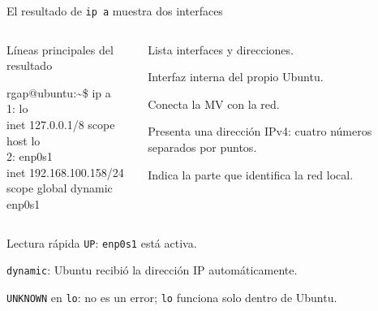 \documentclass[aspectratio=169,10pt,c]{beamer}
\begin{document}
\begin{frame}{El resultado de \texttt{ip a} muestra dos interfaces}
\begin{columns}[T,onlytextwidth]
\begin{exampleblock}{Líneas principales del resultado}
\begin{terminal}
rgap@ubuntu:\textasciitilde\$ ip a\\
1: lo\\
\quad inet 127.0.0.1/8 scope host lo\\
2: enp0s1\\
\quad inet 192.168.100.158/24\\
\quad scope global dynamic enp0s1
\end{terminal}
\end{exampleblock}
\begin{description}\small
  \item[\texttt{ip a}] Lista interfaces y direcciones.
  \item[\texttt{lo}] Interfaz interna del propio Ubuntu.
  \item[\texttt{enp0s1}] Conecta la MV con la red.
  \item[\texttt{inet}] Presenta una dirección IPv4: cuatro números separados por puntos.
  \item[\texttt{/24}] Indica la parte que identifica la red local.
\end{description}
\end{columns}
\begin{alertblock}{Lectura rápida}
\small
\texttt{UP}: \texttt{enp0s1} está activa.\par
\texttt{dynamic}: Ubuntu recibió la dirección IP automáticamente.\par
\texttt{UNKNOWN} en \texttt{lo}: no es un error; \texttt{lo} funciona solo dentro de Ubuntu.
\end{alertblock}
\end{frame}
\end{document}
